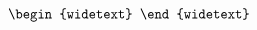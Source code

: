 \documentclass[reprint,hidelinks]{revtex4-2}
\begin{document}
\begin{widetext}
\begin{equation}
\begin{aligned}
\begin{widetext}
%
%
%
%


\end{widetext}
\end{aligned}
\end{equation}
\end{widetext}
\end{document}
